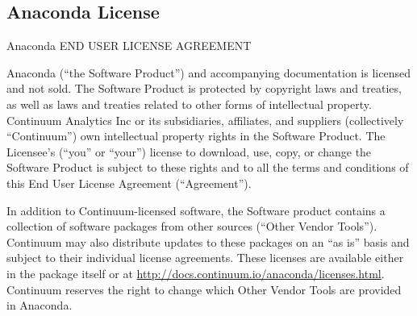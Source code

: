 \documentclass[letterpaper,10pt,openany,oneside]{sphinxmanual}
\begin{document}
\subsection{Anaconda License}
\label{rst/licenses:anaconda-license}
Anaconda END USER LICENSE AGREEMENT

Anaconda (“the Software Product”) and accompanying documentation is licensed and not sold. The Software Product is protected by copyright laws and treaties, as well as laws and treaties related to other forms of intellectual property. Continuum Analytics Inc or its subsidiaries, affiliates, and suppliers (collectively “Continuum”) own intellectual property rights in the Software Product. The Licensee’s (“you” or “your”) license to download, use, copy, or change the Software Product is subject to these rights and to all the terms and conditions of this End User License Agreement (“Agreement”).

In addition to Continuum-licensed software, the Software product contains a collection of software packages from other sources (“Other Vendor Tools”). Continuum may also distribute updates to these packages on an “as is” basis and subject to their individual license agreements. These licenses are available either in the package itself or at \href{http://docs.continuum.io/anaconda/licenses.html}{http://docs.continuum.io/anaconda/licenses.html}. Continuum reserves the right to change which Other Vendor Tools are provided in Anaconda.
\end{document}

